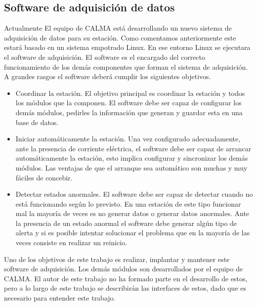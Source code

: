 	\subsection{Software de adquisición de datos}
		Actualmente El equipo de CALMA está desarrollando un nuevo sistema de adquisición de datos para su estación. Como comentamos
		anteriormente este estará basado en un sistema empotrado Linux. En ese entorno Linux se ejecutara el software de adquisición. El software
		es el encargado del correcto funcionamiento de los demás componentes que forman el sistema de adquisición. A grandes rasgos
		el software deberá cumplir los siguientes objetivos.
		\begin{itemize}
			\item 	Coordinar la estación. El objetivo principal es coordinar la estación y todos los módulos que la componen. El software
			  	debe ser capaz de configurar los demás módulos, pedirles la información que generan y guardar esta en una base de datos. 
			\item 	Iniciar automáticamente la estación. Una vez configurado adecuadamente, ante la presencia de corriente eléctrica, el
			  	software debe ser capaz de arrancar automáticamente la estación, esto implica configurar y sincronizar los demás
				módulos. Las ventajas de que el arranque sea automático son muchas y muy fáciles de concebir.
			\item 	Detectar estados anormales. El software debe ser capaz de detectar cuando no está funcionando según lo previsto. En
			  	una estación de este tipo funcionar mal la mayoría de veces es no generar datos o generar datos anormales. Ante la
				presencia de un estado anormal el software debe generar algún tipo de alerta y si es posible intentar solucionar el
				problema que en la mayoría de las veces consiste en realizar un reinicio.
		\end{itemize}
		Uno de los objetivos de este trabajo es realizar, implantar y mantener este software de adquisición. Los demás módulos son desarrollados
		por el equipo de CALMA. El autor de este trabajo no ha formado parte en el desarrollo de estos, pero a lo largo de este trabajo se
		describirán las interfaces de estos, dado que es necesario para entender este trabajo. 
